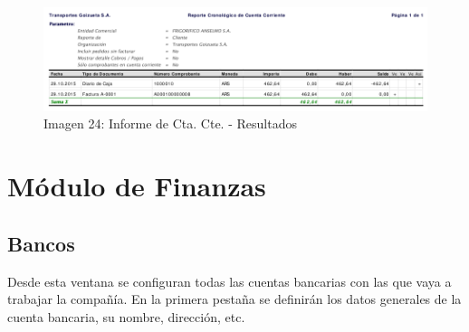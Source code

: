\documentclass[letterpaper,10pt,spanish]{sphinxmanual}
\begin{document}
\begin{figure}[htbp]
\centering
\capstart

\includegraphics{ly_informe_24.png}
\caption{Imagen 24: Informe de Cta. Cte. - Resultados}\end{figure}


\chapter{Módulo de Finanzas}
\label{finanzas:modulo-de-finanzas}\label{finanzas::doc}

\section{Bancos}
\label{finanzas:bancos}
Desde esta ventana se configuran todas las cuentas bancarias con las que vaya a trabajar la compañía. En la primera pestaña se definirán los datos generales de la cuenta bancaria, su nombre, dirección, etc.
\end{document}
